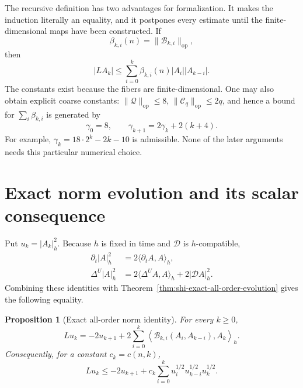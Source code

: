 \documentclass[10pt]{coll-l}
\newtheorem{proposition}[theorem]{Proposition}
\theoremstyle{definition}
\theoremstyle{remark}
\numberwithin{section}{chapter}
\numberwithin{equation}{chapter}
\begin{document}
The recursive definition has two advantages for formalization.  It makes
the induction literally an equality, and it postpones every estimate until
the finite-dimensional maps have been constructed.  If
\[
 \beta_{k,i}(n)=\|\mathcal B_{k,i}\|_{\mathrm{op}},
\]
then
\begin{equation}
 |LA_k|\leq\sum_{i=0}^k
       \beta_{k,i}(n)|A_i||A_{k-i}|.                     \label{eq:shi-Ak-map-bound}
\end{equation}
The constants exist because the fibers are finite-dimensional.  One may
also obtain explicit coarse constants: $\|\mathcal Q\|_{\mathrm{op}}\leq8$,
$\|\mathcal C_q\|_{\mathrm{op}}\leq2q$, and hence a bound for
$\sum_i\beta_{k,i}$ is generated by
\[
       \gamma_0=8,\qquad
       \gamma_{k+1}=2\gamma_k+2(k+4).
\]
For example, $\gamma_k=18\cdot2^k-2k-10$ is admissible.  None of the later
arguments needs this particular numerical choice.

\section{Exact norm evolution and its scalar consequence}
\label{sec:shi-norm-evolution}

Put $u_k=|A_k|_h^2$.  Because $h$ is fixed in time and $\mathcal D$ is
$h$-compatible,
\begin{align}
 \partial_t|A|_h^2&=2\langle\partial_tA,A\rangle_h,       \label{eq:shi-fixed-time-norm}\\
 \Delta^U|A|_h^2
   &=2\langle\Delta^UA,A\rangle_h+2|\mathcal DA|_h^2.    \label{eq:shi-fixed-space-norm}
\end{align}
Combining these identities with
Theorem~\ref{thm:shi-exact-all-order-evolution} gives the following equality.

\begin{proposition}[Exact all-order norm identity]
\label{prop:shi-exact-norm-identity}
For every $k\geq0$,
\begin{equation}
 Lu_k=-2u_{k+1}
    +2\sum_{i=0}^k
       \left\langle
          \mathcal B_{k,i}(A_i,A_{k-i}),A_k
       \right\rangle_h.                                 \label{eq:shi-exact-norm-evolution}
\end{equation}
Consequently, for a constant $c_k=c(n,k)$,
\begin{equation}
 Lu_k\leq-2u_{k+1}
      +c_k\sum_{i=0}^k
          u_i^{1/2}u_{k-i}^{1/2}u_k^{1/2}.               \label{eq:shi-scalar-norm-evolution}
\end{equation}
\end{proposition}
\end{document}
